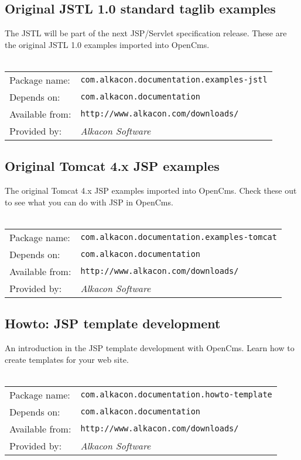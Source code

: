 \subsection{Original JSTL 1.0 standard taglib examples}
The JSTL will be part of the next JSP/Servlet specification release. These are the original 
JSTL 1.0 examples imported into OpenCms.
\\
\\
\begin{tabular}{ll}
Package name: & {\tt com.alkacon.documentation.examples-jstl}\\
Depends on: & {\tt com.alkacon.documentation}\\
Available from: & {\tt http://www.alkacon.com/downloads/}\\
Provided by: & {\em Alkacon Software}\\
\end{tabular}

\subsection{Original Tomcat 4.x JSP examples}
The original Tomcat 4.x JSP examples imported into OpenCms. Check these out to see what you can 
do with JSP in OpenCms.
\\
\\
\begin{tabular}{ll}
Package name: & {\tt com.alkacon.documentation.examples-tomcat}\\
Depends on: & {\tt com.alkacon.documentation}\\
Available from: & {\tt http://www.alkacon.com/downloads/}\\
Provided by: & {\em Alkacon Software}\\
\end{tabular}

\subsection{Howto: JSP template development}
An introduction in the JSP template development with OpenCms. Learn how to create templates 
for your web site.
\\
\\
\begin{tabular}{ll}
Package name: & {\tt com.alkacon.documentation.howto-template}\\
Depends on: & {\tt com.alkacon.documentation}\\
Available from: & {\tt http://www.alkacon.com/downloads/}\\
Provided by: & {\em Alkacon Software}\\
\end{tabular}

